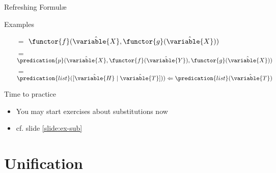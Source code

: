 \documentclass[presentation]{beamer}\mode<presentation>{\usetheme{AMSBolognaFC}}
\begin{document}
\begin{frame}[allowframebreaks]{Refreshing Formul\ae{}}
\begin{exampleblock}{Examples}
\begin{multicols}{2}
\begin{itemize}
                \item[$=$] $\functor{f}(\hat{\variable{X}}, \functor{g}(\hat{\variable{X}}))$
                \item[$=$] $\predication{p}(\hat{\variable{X}}, \functor{f}(\hat{\variable{Y}}), \functor{g}(\hat{\variable{X}}))$
                \item[$=$] $\predication{list}([\hat{\variable{H}} \mid \hat{\variable{T} ]})) \Leftarrow \predication{list}(\hat{\variable{T}})$
            \end{itemize}
        \end{multicols}
    \end{exampleblock}
\end{frame}

\begin{frame}
    \begin{block}{Time to practice}
        \begin{itemize}
            \item You may start exercises about \alert{substitutions} now
            \item cf. slide \ref{slide:ex-sub}
        \end{itemize}
    \end{block}
\end{frame}

\section{Unification}
\end{document}
